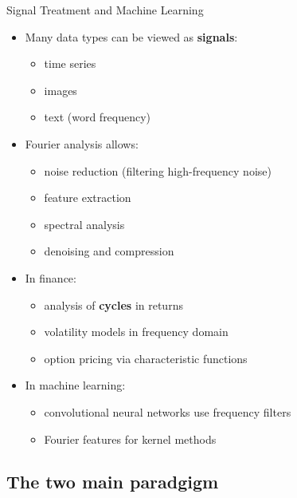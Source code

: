 \documentclass[aspectratio=169]{beamer}
\begin{document}
\begin{frame}{Signal Treatment and Machine Learning}

\begin{itemize}
    \item Many data types can be viewed as \textbf{signals}:
    \begin{itemize}
        \item time series
        \item images
        \item text (word frequency)
    \end{itemize}
\pause
    \item Fourier analysis allows:
    \begin{itemize}
        \item noise reduction (filtering high-frequency noise)
        \item feature extraction
        \item spectral analysis
        \item denoising and compression
    \end{itemize}
\pause
    \item In finance:
    \begin{itemize}
        \item analysis of \textbf{cycles} in returns
        \item volatility models in frequency domain
        \item option pricing via characteristic functions
    \end{itemize}
\pause
    \item In machine learning:
    \begin{itemize}
        \item convolutional neural networks use frequency filters
        \item Fourier features for kernel methods
    \end{itemize}
\end{itemize}

\end{frame}


\subsection{The two main paradgigm}
\end{document}
